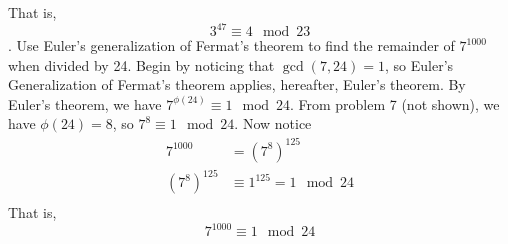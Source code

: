 \documentclass{article}
\begin{document}
That is, 
\[3^{47} \equiv 4 \mod 23\]
\newline{}. Use Euler's generalization of Fermat's theorem to find the remainder of $7^{1000}$ when divided by 24.
\newline\newline
Begin by noticing that $\gcd{(7,24)} = 1$, so Euler's Generalization of Fermat's theorem applies, hereafter, Euler's theorem. By Euler's theorem, we have $7^{\phi(24)} \equiv 1 \mod 24$. From problem 7 (not shown), we have $\phi(24) = 8$, so $7^8 \equiv 1 \mod 24$. Now notice
\begin{align*}
    7^{1000} &= (7^{8})^{125} \\
    (7^8)^{125} &\equiv 1^{125} = 1 \mod 24 \\
\end{align*}
That is, 
\[7^{1000} \equiv 1 \mod 24\]
\newline\newline
\end{document}
